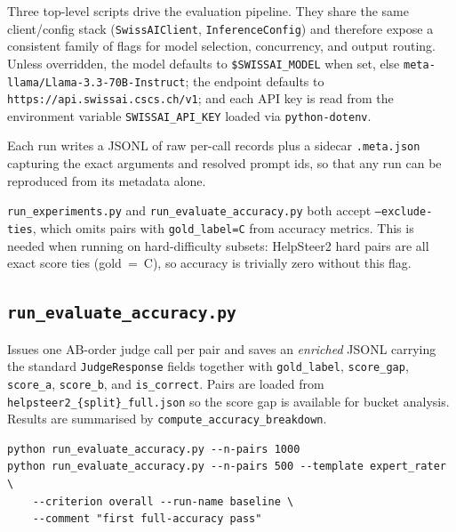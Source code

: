 %

Three top-level scripts drive the evaluation pipeline. They share the same
client/config stack (\texttt{SwissAIClient}, \texttt{InferenceConfig}) and
therefore expose a consistent family of flags for model selection,
concurrency, and output routing. Unless overridden, the model defaults to
\texttt{\$SWISSAI\_MODEL} when set, else
\texttt{meta-llama/Llama-3.3-70B-Instruct}; the endpoint defaults to
\texttt{https://api.swissai.cscs.ch/v1}; and each API key is read from the
environment variable \texttt{SWISSAI\_API\_KEY} loaded via
\texttt{python-dotenv}.

Each run writes a JSONL of raw per-call records plus a sidecar
\texttt{.meta.json} capturing the exact arguments and resolved prompt ids,
so that any run can be reproduced from its metadata alone.

\texttt{run\_experiments.py} and \texttt{run\_evaluate\_accuracy.py} both
accept \texttt{--exclude-ties}, which omits pairs with \texttt{gold\_label=C}
from accuracy metrics. This is needed when running on hard-difficulty subsets:
HelpSteer2 hard pairs are all exact score ties (gold~=~C), so accuracy is
trivially zero without this flag.


\subsection{\texttt{run\_evaluate\_accuracy.py}}\label{sec:cli-acc}

Issues one AB-order judge call per pair and saves an \emph{enriched}
JSONL carrying the standard \texttt{JudgeResponse} fields together with
\texttt{gold\_label}, \texttt{score\_gap}, \texttt{score\_a}, \texttt{score\_b},
and \texttt{is\_correct}. Pairs are loaded from
\texttt{helpsteer2\_\{split\}\_full.json} so the score gap is available for
bucket analysis. Results are summarised by \texttt{compute\_accuracy\_breakdown}.

\begin{lstlisting}[title={\small Typical invocation}]
python run_evaluate_accuracy.py --n-pairs 1000
python run_evaluate_accuracy.py --n-pairs 500 --template expert_rater \
    --criterion overall --run-name baseline \
    --comment "first full-accuracy pass"
\end{lstlisting}


